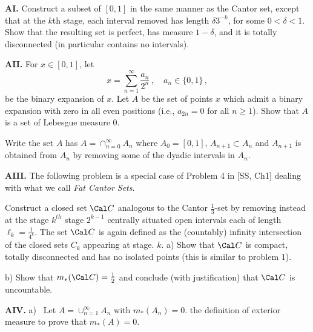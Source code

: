 \medskip


\medskip


{\bf AI.} Construct a subset of $[0,1]$ in the same manner as the Cantor set, except that at the $k$th stage, each interval removed has length $\delta 3^{-k}$, for some $0<\delta<1$. Show that the resulting set is perfect, has measure $1-\delta$, and it is totally disconnected (in particular contains no intervals). 

\bigskip

 {\bf AII.}   For $x \in [0,1]$,  let 
$$
x = \sum_{n=1}^\infty \frac{a_n}{2^n} \,, \quad   a_{n} \in \{0,1\} \,, $$
be the binary expansion of $x$.    Let $A$ be the set of points $x$ which admit a binary expansion
with zero in all even positions (i.e., $a_{2n}=0$ for all $n \ge 1$).   Show that $A$ is a set  of 
Lebesgue measure $0$. 
\medskip

{}  Write the set $A$ has $A = \cap_{n=0}^\infty A_n$ where $A_0=[0,1]$,  $A_{n+1} \subset A_n$ and $A_{n+1}$ is obtained from $A_n$ by  removing some of the dyadic intervals in $A_n$. 


\bigskip


{\bf AIII.} The following problem is a special case of Problem 4 in [SS, Ch1] dealing with what we call {\it Fat Cantor Sets}. 

Construct a closed set $\Cal C$ analogous to the Cantor $\frac{1}{3}$-set by removing instead at the stage $k^{th}$ stage $2^{k-1}$ centrally situated open intervals each of length $\ell_k= \frac{1}{4^k}$.  The set 
$\Cal C$ is again defined as the (countably) infinity intersection of the closed sets $C_k$ appearing at stage.
 $k$.
  \smallskip
 a) Show that $\Cal C$ is compact, totally disconnected and has no isolated points (this is similar to problem 1).
 
 \smallskip
  b) Show that $m_{\ast}(\Cal C) = \frac{1}{2}$ and conclude (with justification) that $\Cal C$ is uncountable.

\bigskip

{\bf AIV.}   a) \, Let $ A = \cup_{n=1}^{\infty} A_n$ with $ m_{\ast}(A_n) = 0$.  the definition of exterior measure to prove that $m_{\ast}(A) =0$.

\smallskip

